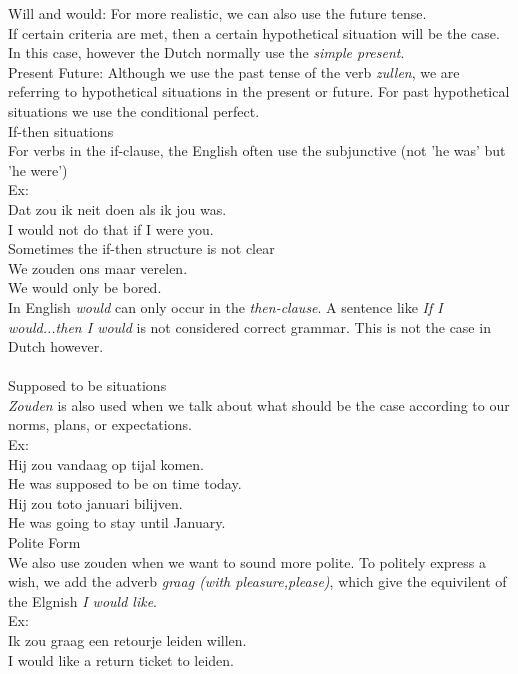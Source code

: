 \documentclass[letterpaper,11pt]{article}
\begin{document}
Will and would: For more realistic, we can also use the future tense. \\
If certain criteria are met, then a certain hypothetical situation will be the
case. In this case, however the Dutch normally use the \textit{simple present}.
\\
Present Future: Although we use the past tense of the verb \textit{zullen}, we
are referring to hypothetical situations in the present or future. For past
hypothetical situations we use the conditional perfect.  \\
If-then situations \\
For verbs in the if-clause, the English often use the subjunctive (not 'he was'
but 'he were') %
\\
Ex: \\
Dat zou ik neit doen als ik jou was. \\
I would not do that if I were you. \\
Sometimes the if-then structure is not clear \\
We zouden ons maar verelen.\\ 
We would only be bored. \\ %
In English \textit{would} can only occur in the \textit{then-clause}. A sentence
like \textit{If I would...then I would} is not considered correct grammar. This
is not the case in Dutch however. \\ \\
Supposed to be situations \\
\textit{Zouden} is also used when we talk about what should be the case
according to our norms, plans, or expectations. \\
Ex: \\
Hij zou vandaag op tijal komen. \\
He was supposed to be on time today. \\
Hij zou toto januari bilijven. \\
He was going to stay until January. \\
Polite Form \\
We also use zouden when we want to sound more polite. To politely express a
wish, we add the adverb \textit{graag (with pleasure,please)}, which give the
equivilent of the Elgnish \textit{I would like}. \\ 
Ex: \\
Ik zou graag een retourje leiden willen. \\
I would like a return ticket to leiden. \\
\end{document}
